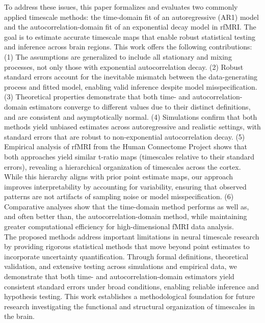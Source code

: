 \documentclass[docs/main.tex]{subfiles}
\begin{document}
To address these issues, this paper formalizes and evaluates two commonly applied timescale methods: the time-domain fit of an autoregressive (AR1) model and the autocorrelation-domain fit of an exponential decay model in rfMRI. The goal is to estimate accurate timescale maps that enable robust statistical testing and inference across brain regions. This work offers the following contributions: (1) The assumptions are generalized to include all stationary and mixing processes, not only those with exponential autocorrelation decay. (2) Robust standard errors account for the inevitable mismatch between the data-generating process and fitted model, enabling valid inference despite model misspecification. (3) Theoretical properties demonstrate that both time- and autocorrelation-domain estimators converge to different values due to their distinct definitions, and are consistent and asymptotically normal. (4) Simulations confirm that both methods yield unbiased estimates across autoregressive and realistic settings, with standard errors that are robust to non-exponential autocorrelation decay. (5) Empirical analysis of rfMRI from the Human Connectome Project shows that both approaches yield similar t-ratio maps (timescales relative to their standard errors), revealing a hierarchical organization of timescales across the cortex. While this hierarchy aligns with prior point estimate maps, our approach improves interpretability by accounting for variability, ensuring that observed patterns are not artifacts of sampling noise or model misspecification. (6) Comparative analyses show that the time-domain method performs as well as, and often better than, the autocorrelation-domain method, while maintaining greater computational efficiency for high-dimensional fMRI data analysis.\\

The proposed methods address important limitations in neural timescale research by providing rigorous statistical methods that move beyond point estimates to incorporate uncertainty quantification. Through formal definitions, theoretical validation, and extensive testing across simulations and empirical data, we demonstrate that both time- and autocorrelation-domain estimators yield consistent standard errors under broad conditions, enabling reliable inference and hypothesis testing. This work establishes a methodological foundation for future research investigating the functional and structural organization of timescales in the brain.
\end{document}
